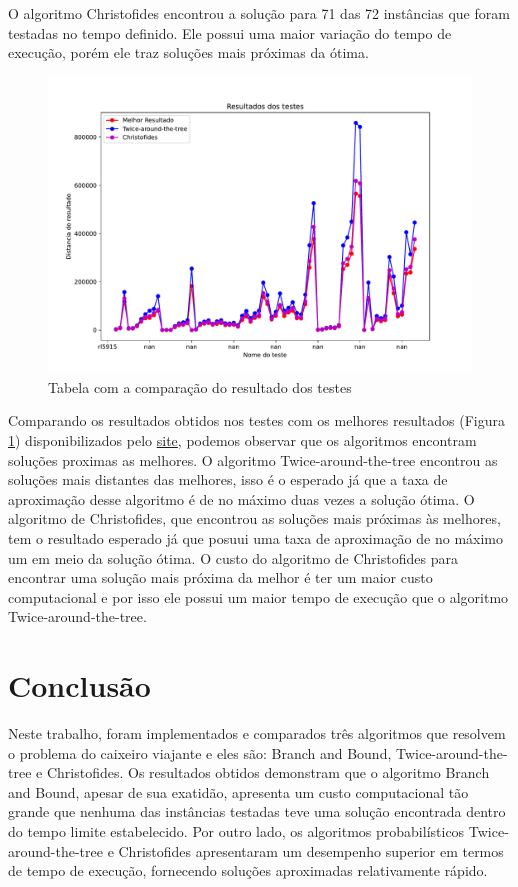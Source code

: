 \documentclass[12pt]{article}
\begin{document}
O algoritmo Christofides encontrou a solução para 71 das 72 instâncias que foram testadas no tempo definido. Ele possui uma maior variação do tempo de execução, porém ele traz soluções mais próximas da ótima.

\begin{figure}[ht]
\centering
\includegraphics[width=.8\textwidth]{../Figura3.pdf}
\caption{Tabela com a comparação do resultado dos testes}
\label{fig:fig3}
\end{figure}

Comparando os resultados obtidos nos testes com os melhores resultados (Figura \ref{fig:fig3}) disponibilizados pelo \href{http://comopt.ifi.uni-heidelberg.de/software/TSPLIB95/tsp/}{site}, podemos observar que os algoritmos encontram soluções proximas as melhores. O algoritmo Twice-around-the-tree encontrou as soluções mais distantes das melhores, isso é o esperado já que a taxa de aproximação desse algoritmo é de no máximo duas vezes a solução ótima. O algoritmo de Christofides, que encontrou as soluções mais próximas às melhores, tem o resultado esperado já que posuui uma taxa de aproximação de no máximo um em meio da solução ótima. O custo do algoritmo de Christofides para encontrar uma solução mais próxima da melhor é ter um maior custo computacional e por isso ele possui um maior tempo de execução que o algoritmo Twice-around-the-tree. 

\section{Conclusão}

Neste trabalho, foram implementados e comparados três algoritmos que resolvem o problema do caixeiro viajante e eles são: Branch and Bound, Twice-around-the-tree e Christofides. Os resultados obtidos demonstram que o algoritmo Branch and Bound, apesar de sua exatidão, apresenta um custo computacional tão grande que nenhuma das instâncias testadas teve uma solução encontrada dentro do tempo limite estabelecido. Por outro lado, os algoritmos probabilísticos Twice-around-the-tree e Christofides apresentaram um desempenho superior em termos de tempo de execução, fornecendo soluções aproximadas relativamente rápido.
\end{document}
